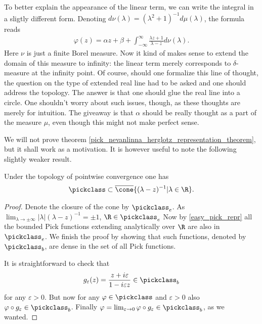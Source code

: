 To better explain the appearance of the linear term, we can write the integral in a sligtly different form. Denoting $d \nu(\lambda) = (\lambda^2 + 1)^{-1} d \mu(\lambda)$, the formula reads
\begin{align*}
	\varphi(z) = \alpha z + \beta + \int_{-\infty}^{\infty} \frac{\lambda z + 1}{\lambda - z} d \nu(\lambda).
\end{align*}
Here $\nu$ is just a finite Borel measure. Now it kind of makes sense to extend the domain of this measure to infinity: the linear term merely corresponds to $\delta$-measure at the infinity point. Of course, should one formalize this line of thought, the question on the type of extended real line had to be asked and one should address the topology. The answer is that one should glue the real line into a circle. One shouldn't worry about such issues, though, as these thoughts are merely for intuition. The giveaway is that $\alpha$ should be really thought as a part of the measure $\mu$, even though this might not make perfect sense.

We will not prove theorem \ref{pick_nevanlinna_herglotz_representation_theorem}, but it shall work as a motivation. It is however useful to note the following slightly weaker result.
\begin{lem}\label{pick_dense}
	Under the topology of pointwise convergence one has
	\begin{align*}
		\pickclass \subset \overline{\cone}\{(\lambda - z)^{-1} | \lambda \in \R\}.
	\end{align*}
\end{lem}
\begin{proof}
	Denote the closure of the cone by $\pickclass_{e}$. As $\lim_{\lambda \to \pm \infty}|\lambda|(\lambda - z)^{-1} = \pm 1$, $\R \in \pickclass_{e}$ Now by \ref{easy_pick_repr} all the bounded Pick functions extending analytically over $\R$ are also in $\pickclass_{e}$. We finish the proof by showing that such functions, denoted by $\pickclass_{b}$, are dense in the set of all Pick functions.

	It is straightforward to check that
	\begin{align*}
		g_{\varepsilon}(z) = \frac{z + i \varepsilon}{1 - i \varepsilon z} \in \pickclass_{b}
	\end{align*}
	for any $\varepsilon > 0$. But now for any $\varphi \in \pickclass$ and $\varepsilon > 0$ also $\varphi \circ g_{\varepsilon} \in \pickclass_{b}$. Finally $\varphi = \lim_{\varepsilon \to 0} \varphi \circ g_{\varepsilon} \in \pickclass_{b}$, as we wanted.
\end{proof}

